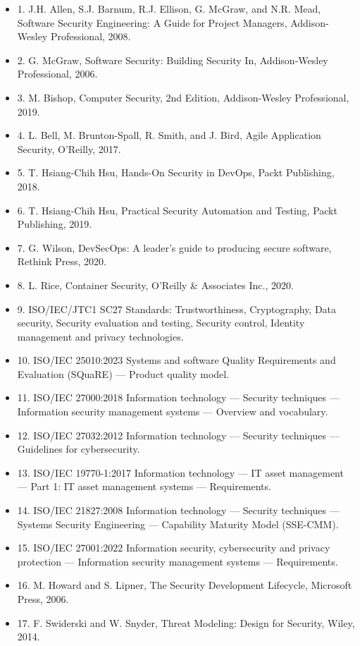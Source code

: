 \documentclass[a4paper,11pt]{ltjsarticle}
\numberwithin{figure}{section}
\numberwithin{table}{section}
\begin{document}
\begin{itemize}[leftmargin=2em]
\item 1. J.H. Allen, S.J. Barnum, R.J. Ellison, G. McGraw, and N.R. Mead, Software Security Engineering: A Guide for Project Managers, Addison-Wesley Professional, 2008.
\item 2. G. McGraw, Software Security: Building Security In, Addison-Wesley Professional, 2006.
\item 3. M. Bishop, Computer Security, 2nd Edition, Addison-Wesley Professional, 2019.
\item 4. L. Bell, M. Brunton-Spall, R. Smith, and J. Bird, Agile Application Security, O’Reilly, 2017.
\item 5. T. Hsiang-Chih Hsu, Hands-On Security in DevOps, Packt Publishing, 2018.
\item 6. T. Hsiang-Chih Hsu, Practical Security Automation and Testing, Packt Publishing, 2019.
\item 7. G. Wilson, DevSecOps: A leader’s guide to producing secure software, Rethink Press, 2020.
\item 8. L. Rice, Container Security, O’Reilly \& Associates Inc., 2020.
\item 9. ISO/IEC/JTC1 SC27 Standards: Trustworthiness, Cryptography, Data security, Security evaluation and testing, Security control, Identity management and privacy technologies.
\item 10. ISO/IEC 25010:2023 Systems and software Quality Requirements and Evaluation (SQuaRE) — Product quality model.
\item 11. ISO/IEC 27000:2018 Information technology — Security techniques — Information security management systems — Overview and vocabulary.
\item 12. ISO/IEC 27032:2012 Information technology — Security techniques — Guidelines for cybersecurity.
\item 13. ISO/IEC 19770-1:2017 Information technology — IT asset management — Part 1: IT asset management systems — Requirements.
\item 14. ISO/IEC 21827:2008 Information technology — Security techniques — Systems Security Engineering — Capability Maturity Model (SSE-CMM).
\item 15. ISO/IEC 27001:2022 Information security, cybersecurity and privacy protection — Information security management systems — Requirements.
\item 16. M. Howard and S. Lipner, The Security Development Lifecycle, Microsoft Press, 2006.
\item 17. F. Swiderski and W. Snyder, Threat Modeling: Design for Security, Wiley, 2014.

\end{itemize}
\end{document}
